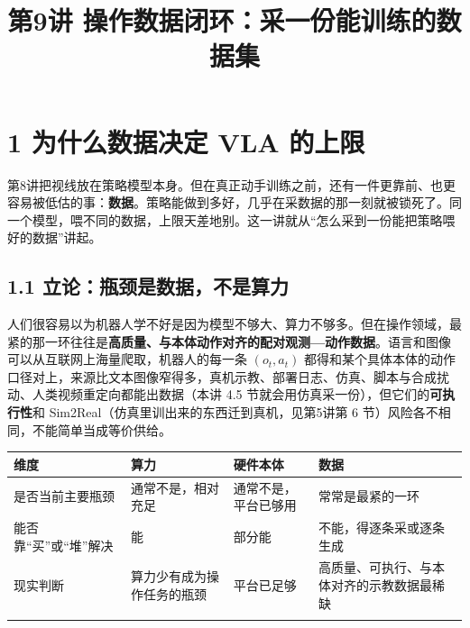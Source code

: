 \documentclass[
  chinese,
]{ctexart}
\title{第9讲 操作数据闭环：采一份能训练的数据集}
\author{}
\date{}
\renewcommand*\contentsname{目录}
\newcommand\contentsname{目录}
\begin{document}
\maketitle

\renewcommand*\contentsname{目录}
{
\setcounter{tocdepth}{3}
\tableofcontents
}

\section{1 为什么数据决定 VLA
的上限}\label{ux4e3aux4ec0ux4e48ux6570ux636eux51b3ux5b9a-vla-ux7684ux4e0aux9650}

第8讲把视线放在策略模型本身。但在真正动手训练之前，还有一件更靠前、也更容易被低估的事：\textbf{数据}。策略能做到多好，几乎在采数据的那一刻就被锁死了。同一个模型，喂不同的数据，上限天差地别。这一讲就从``怎么采到一份能把策略喂好的数据''讲起。

\subsection{1.1
立论：瓶颈是数据，不是算力}\label{ux7acbux8bbaux74f6ux9888ux662fux6570ux636eux4e0dux662fux7b97ux529b}

人们很容易以为机器人学不好是因为模型不够大、算力不够多。但在操作领域，最紧的那一环往往是\textbf{高质量、与本体动作对齐的配对观测---动作数据}。语言和图像可以从互联网上海量爬取，机器人的每一条
\((o_t, a_t)\)
都得和某个具体本体的动作口径对上，来源比文本图像窄得多，真机示教、部署日志、仿真、脚本与合成扰动、人类视频重定向都能出数据（本讲
4.5 节就会用仿真采一份），但它们的\textbf{可执行性}和
Sim2Real（仿真里训出来的东西迁到真机，见第5讲第 6
节）风险各不相同，不能简单当成等价供给。

\begin{center}
\begin{tabular}{@{}>{\raggedright\arraybackslash}p{} >{\raggedright\arraybackslash}p{} >{\raggedright\arraybackslash}p{} >{\raggedright\arraybackslash}p{}@{}}
\toprule\noalign{}
维度 & 算力 & 硬件本体 & 数据 \\
\midrule\noalign{}
是否当前主要瓶颈 & 通常不是，相对充足 & 通常不是，平台已够用 & 常常是最紧的一环 \\
能否靠``买''或``堆''解决 & 能 & 部分能 & 不能，得逐条采或逐条生成 \\
现实判断 & 算力少有成为操作任务的瓶颈 & 平台已足够 & 高质量、可执行、与本体对齐的示教数据最稀缺 \\
\bottomrule\noalign{}
\end{tabular}
\end{center}
\end{document}
